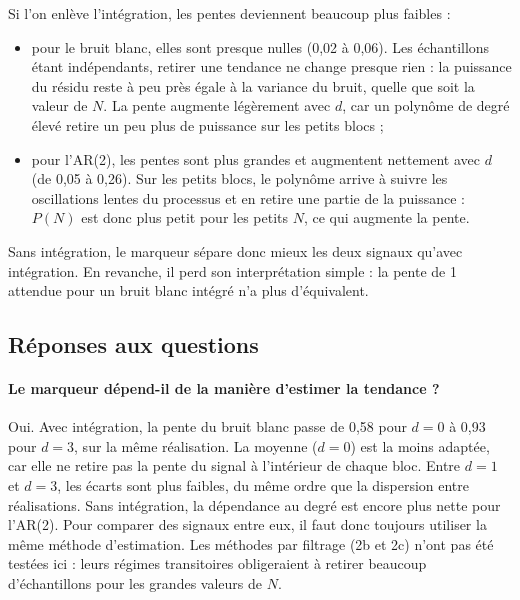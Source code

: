 \documentclass[11pt,a4paper]{article}
\begin{document}
Si l'on enlève l'intégration, les pentes deviennent beaucoup plus faibles :
\begin{itemize}
  \item pour le bruit blanc, elles sont presque nulles (0,02 à 0,06). Les échantillons étant
  indépendants, retirer une tendance ne change presque rien : la puissance du résidu reste à
  peu près égale à la variance du bruit, quelle que soit la valeur de $N$. La pente augmente
  légèrement avec $d$, car un polynôme de degré élevé retire un peu plus de puissance sur
  les petits blocs ;
  \item pour l'AR(2), les pentes sont plus grandes et augmentent nettement avec $d$ (de 0,05
  à 0,26). Sur les petits blocs, le polynôme arrive à suivre les oscillations lentes du
  processus et en retire une partie de la puissance : $P(N)$ est donc plus petit pour les
  petits $N$, ce qui augmente la pente.
\end{itemize}
Sans intégration, le marqueur sépare donc mieux les deux signaux qu'avec intégration. En
revanche, il perd son interprétation simple : la pente de 1 attendue pour un bruit blanc
intégré n'a plus d'équivalent.

\subsection{Réponses aux questions}

\paragraph{Le marqueur dépend-il de la manière d'estimer la tendance ?} Oui. Avec
intégration, la pente du bruit blanc passe de 0,58 pour $d = 0$ à 0,93 pour $d = 3$, sur la
même réalisation. La moyenne ($d = 0$) est la moins adaptée, car elle ne retire pas la
pente du signal à l'intérieur de chaque bloc. Entre $d = 1$ et $d = 3$, les écarts sont plus
faibles, du même ordre que la dispersion entre réalisations. Sans intégration, la
dépendance au degré est encore plus nette pour l'AR(2). Pour comparer des signaux entre
eux, il faut donc toujours utiliser la même méthode d'estimation. Les méthodes par filtrage
(2b et 2c) n'ont pas été testées ici : leurs régimes transitoires obligeraient à retirer
beaucoup d'échantillons pour les grandes valeurs de $N$.
\end{document}
